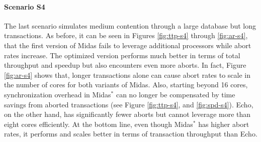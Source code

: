 \paragraph{Scenario S4}

The last scenario simulates medium contention through a large database but long
transactions. As before, it can be seen in Figures \ref{fig:ttp-s4} through
\ref{fig:ar-s4}, that the first version of Midas fails to leverage additional
processors while abort rates increase. The optimized version performs much
better in terms of total throughput and speedup but also encounters even more
aborts. In fact, Figure \ref{fig:ar-s4} shows that, longer transactions alone
can cause abort rates to scale in the number of cores for both variants of
Midas. Also, starting beyond 16 cores, synchronization overhead in Midas$^{*}$
can no longer be compensated by time savings from aborted transactions (see
Figure \ref{fig:ttp-s4}, and \ref{fig:spd-s4}). Echo, on the other hand, has
significantly fewer aborts but cannot leverage more than eight cores
efficiently. At the bottom line, even though Midas$^{*}$ has higher abort rates,
it performs and scales better in terms of transaction throughput than Echo.

